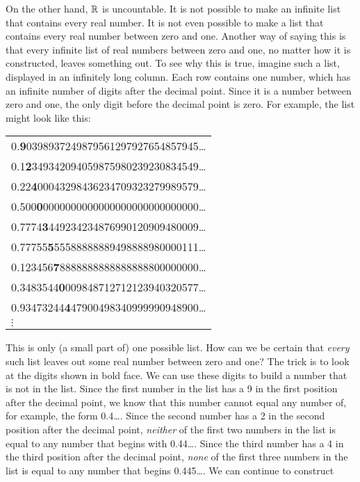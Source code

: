 On the other hand, ${\mathbb R}$ is uncountable.  It is not possible to
make an infinite list that contains every real number.  It is
not even possible to make a list that contains every real
number between zero and one.  Another way of saying this is that
every infinite list of real numbers between zero and one, no 
matter how it is constructed, leaves something out.  To see why
this is true, imagine such a list, displayed in an infinitely long
column.  Each row contains one number, which has an infinite
number of digits after the decimal point.  Since it is a number
between zero and one, the only digit before the decimal point is
zero.  For example, the list might look like this:
\begin{center}
\begin{tabular}{l}
    0.\textbf{9}0398937249879561297927654857945\dots\\
    0.1\textbf{2}349342094059875980239230834549\dots\\
    0.22\textbf{4}00043298436234709323279989579\dots\\
    0.500\textbf{0}0000000000000000000000000000\dots\\
    0.7774\textbf{3}449234234876990120909480009\dots\\
    0.77755\textbf{5}55588888889498888980000111\dots\\
    0.123456\textbf{7}8888888888888888800000000\dots\\
    0.3483544\textbf{0}009848712712123940320577\dots\\
    0.93473244\textbf{4}47900498340999990948900\dots\\
    \qquad $\vdots$
\end{tabular}
\end{center}
This is only (a small part of) one possible list.  How can we be certain
that \emph{every} such list leaves out some real number between
zero and one?  The trick is to look at the digits shown in bold face.
We can use these digits to build a number that is not in the
list.  Since the first number in the list has a 9 in the first
position after the decimal point, we know that this number
cannot equal any number of, for example, the form 0.4\dots.  Since the second
number has a 2 in the second position after the decimal point,
\emph{neither} of the first two numbers in the list is
equal to any number that begins with 0.44\dots.  Since the third
number has a 4 in the third position after the decimal point,
\emph{none} of the first three numbers in the list is equal to any
number that begins 0.445\dots.  We can continue to construct
